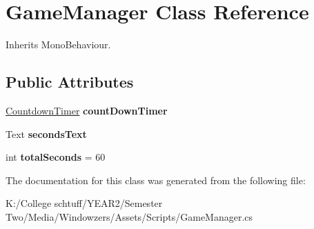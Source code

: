 \hypertarget{class_game_manager}{}\section{Game\+Manager Class Reference}
\label{class_game_manager}


Inherits Mono\+Behaviour.

\subsection*{Public Attributes}
\begin{DoxyCompactItemize}
\item 
\mbox{\label{class_game_manager_ae52d494404f274c50feeef2a53b9c361}} 
\hyperlink{class_countdown_timer}{Countdown\+Timer} {\bfseries count\+Down\+Timer}
\item 
\mbox{\label{class_game_manager_ac18c27dd1273850d45aabced16af6515}} 
Text {\bfseries seconds\+Text}
\item 
\mbox{\label{class_game_manager_a629607ab86f03322b7a66016ae41e6af}} 
int {\bfseries total\+Seconds} = 60
\end{DoxyCompactItemize}


The documentation for this class was generated from the following file\+:\begin{DoxyCompactItemize}
\item 
K\+:/\+College schtuff/\+Y\+E\+A\+R2/\+Semester Two/\+Media/\+Windowzers/\+Assets/\+Scripts/Game\+Manager.\+cs\end{DoxyCompactItemize}

